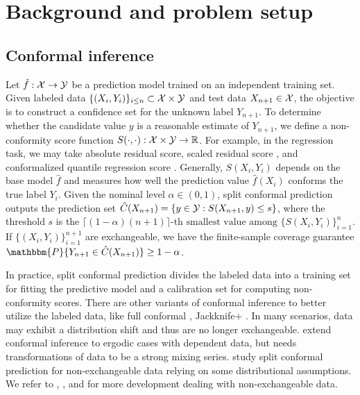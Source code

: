 \section{Background and problem setup}
\vspace{-0.5em}
\subsection{Conformal inference}
\vspace{-0.5em}
Let $\hat{f}:{\mathcal{X}} \to {\mathcal{Y}}$ be a prediction model trained on an independent training set. Given labeled data $\{(X_i,Y_i)\}_{i\leq n} \subset {\mathcal{X}} \times {\mathcal{Y}}$ and test data $X_{n+1} \in {\mathcal{X}}$, the objective is to construct a confidence set for the unknown label $Y_{n+1}$. To determine whether the candidate value $y$ is a reasonable estimate of $Y_{n+1}$, we define a non-conformity score function 
$S(\cdot,\cdot): {\mathcal{X}} \times {\mathcal{Y}} \to {\mathbb{R}}$. For example, in the regression task, we may take absolute residual score, scaled residual score \citep{lei2018distribution}, and conformalized quantile regression score \citep{romano2019conformalized}.
Generally, $S(X_i, Y_i)$ depends on the base model $\hat{f}$ and measures how well the prediction value $\hat{f}(X_i)$ conforms the true label $Y_i$.
Given the nominal level $\alpha \in (0,1)$, split conformal prediction \citep{papadopoulos2002inductive,lei2018distribution} outputs the prediction set $\hat{C}(X_{n+1})=\{y\in {\mathcal{Y}}: S(X_{n+1},y)\leq s\}$, where the threshold $s$ is the $\lceil(1-\alpha)(n+1)\rceil\text{-th smallest value among }\{S(X_i,Y_i)\}_{i=1}^n$. If $\{(X_i,Y_i)\}_{i=1}^{n+1}$ are exchangeable, we have the finite-sample coverage guarantee $\mathbbm{P}\{Y_{n+1} \in \hat{C}(X_{n+1})\}\geq 1-\alpha$.

In practice, split conformal prediction divides the labeled data into a training set for fitting the predictive model and a calibration set for computing non-conformity scores. There are other variants of conformal inference to better utilize the labeled data, like full conformal \citep{vovk2005algorithmic}, Jackknife+ \citep{barber2021predictive}. In many scenarios, data may exhibit a distribution shift and thus are no longer exchangeable. \citet{chernozhukov2018exact} extend conformal inference to ergodic cases with dependent data, but needs transformations of data to be a strong mixing series. \citet{oliveira2024split} study split conformal prediction for non-exchangeable data relying on some distributional assumptions.
We refer to \cite{tibshirani2019conformal}, \cite{podkopaev2021distribution}, \cite{barber2023conformal} and \cite{yang2024doubly} for more development dealing with non-exchangeable data.



